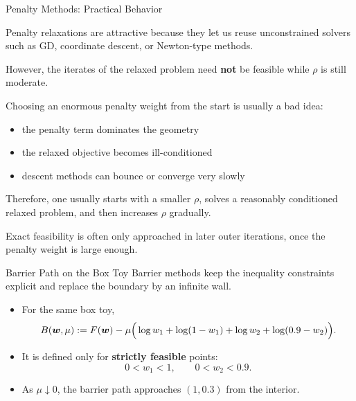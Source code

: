 \documentclass[11pt,compress,t,notes=noshow, xcolor=table]{beamer}
\begin{document}
\begin{framei}[fs=footnotesize]{Penalty Methods: Practical Behavior}
\item Penalty relaxations are attractive because they let us reuse unconstrained solvers such as GD, coordinate descent, or Newton-type methods.
\item However, the iterates of the relaxed problem need \textbf{not} be feasible while $\rho$ is still moderate.
\item Choosing an enormous penalty weight from the start is usually a bad idea:
\begin{itemize}
\item the penalty term dominates the geometry
\item the relaxed objective becomes ill-conditioned
\item descent methods can bounce or converge very slowly
\end{itemize}
\item Therefore, one usually starts with a smaller $\rho$, solves a reasonably conditioned relaxed problem, and then increases $\rho$ gradually.
\item Exact feasibility is often only approached in later outer iterations, once the penalty weight is large enough.
\end{framei}


\begin{framev}[fs=scriptsize]{Barrier Path on the Box Toy}
Barrier methods keep the inequality constraints explicit and replace the boundary by an infinite wall.
\begin{itemize}
\item For the same box toy,
\[
B(\bm{w},\mu)
:=
F(\bm{w})
- \mu \Big(
\log w_1 + \log(1-w_1) + \log w_2 + \log(0.9-w_2)
\Big).
\]
\item It is defined only for \textbf{strictly feasible} points:
\[
0 < w_1 < 1,
\qquad
0 < w_2 < 0.9.
\]
\item As $\mu \downarrow 0$, the barrier path approaches $(1,0.3)$ from the interior.
\end{itemize}
\end{framev}
\end{document}

